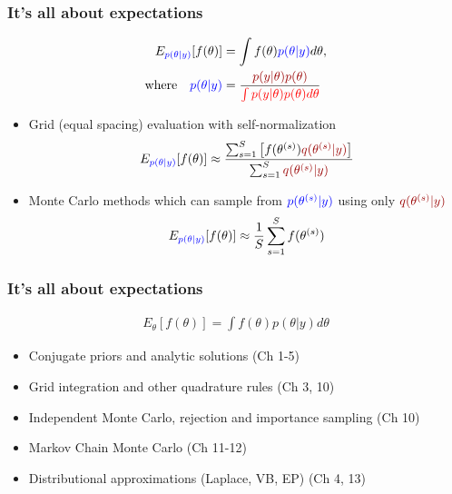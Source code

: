 \documentclass[10pt]{beamer}
\begin{document}
\begin{frame}

\frametitle{It's all about expectations}

  \vspace{-1.5\baselineskip}
   \begin{align*}
     E_{\color{blue} p(\theta|y)}[f(\theta)] & = \int f(\theta) {\color{blue} p(\theta|y)} d\theta,\\
     \text{where} \quad
     {\color{blue} p(\theta|y)} & = \frac{\color{uured}p(y|\theta)p(\theta)}{\color{red} \int p(y|\theta)p(\theta) d\theta}
   \end{align*}

 \begin{itemize}
   \vspace{-0.5\baselineskip}
    \item<4-> Grid (equal spacing) evaluation with self-normalization
      \begin{align*}
        E_{\color{blue} p(\theta|y)}[f(\theta)] \approx
        \frac{\sum_{s=1}^S \left[f(\theta^{(s)}){\color{uured}q(\theta^{(s)}|y)}\right]}{\sum_{s=1}^S{\color{uured}q(\theta^{(s)}|y)}}
      \end{align*}
    \item<5-> Monte Carlo methods which can sample from
      ${\color{blue}p(\theta^{(s)}|y)}$ using only
      ${\color{uured}q(\theta^{(s)}|y)}$
         \vspace{-0.5\baselineskip}
      \begin{align*}
        E_{\color{blue} p(\theta|y)}[f(\theta)] \approx \frac{1}{S} \sum_{s=1}^S f(\theta^{(s)})
      \end{align*}
    \end{itemize}

\end{frame}

\begin{frame}


\frametitle{It's all about expectations}

   \begin{align*}
   E_{\theta}[f(\theta)] = \int f(\theta) p(\theta|y) d\theta
   \end{align*}

  \begin{itemize}
  \item Conjugate priors and analytic solutions (Ch 1-5)
  \item Grid integration and other quadrature rules (Ch 3, 10)
  \item Independent Monte Carlo, rejection and importance sampling (Ch 10)
  \item Markov Chain Monte Carlo (Ch 11-12)
  \item Distributional approximations (Laplace, VB, EP) (Ch 4, 13)
  \end{itemize}


 \end{frame}
\end{document}
